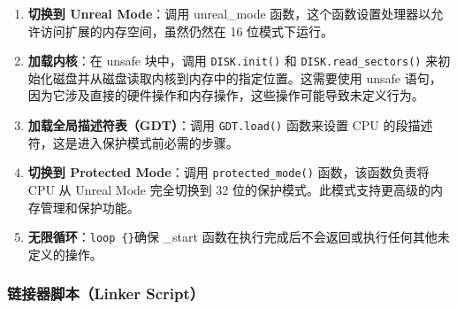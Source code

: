 \begin{enumerate}
{              ELF 格式提供了一种灵活且强大的方式来组织和使用不同类型的代码和数据。这种格式的统一性和广泛支持使其成为了现代操作系统在处理可执行文件和库时的首选格式。它也支持高级特性如动态链接和执行时重定位，这些特性对于现代操作系统的动态性和模块化非常重要。}的 .start 段中。这是 bootloader 约定用于存放入口点代码的段。
    \item \textbf{切换到 Unreal Mode}：调用 unreal\_mode 函数，这个函数设置处理器以允许访问扩展的内存空间，虽然仍然在 16 位模式下运行。
    \item \textbf{加载内核}：在 unsafe 块中，调用 \texttt{DISK.init()} 和 \texttt{DISK.read\_sectors()} 来初始化磁盘并从磁盘读取内核到内存中的指定位置。这需要使用 unsafe 语句，因为它涉及直接的硬件操作和内存操作，这些操作可能导致未定义行为。
    \item \textbf{加载全局描述符表（GDT）}：调用 \texttt{GDT.load()} 函数来设置 CPU 的段描述符，这是进入保护模式前必需的步骤。
    \item \textbf{切换到 Protected Mode}：调用 \texttt{protected\_mode()} 函数，该函数负责将 CPU 从 Unreal Mode 完全切换到 32 位的保护模式。此模式支持更高级的内存管理和保护功能。
    \item \textbf{无限循环}：\texttt{loop \{\}}确保 \_start 函数在执行完成后不会返回或执行任何其他未定义的操作。
\end{enumerate}

\subsubsection{链接器脚本（Linker Script）}